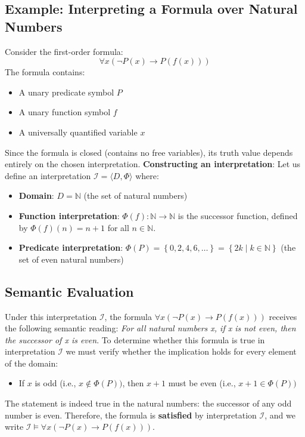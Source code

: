 \documentclass[a4paper]{article}
\theoremstyle{definition}
\begin{document}
\subsection{Example: Interpreting a Formula over Natural Numbers}
Consider the first-order formula:
\[
  \forall x (\lnot P(x) \rightarrow P(f(x)))
\]
The formula contains:
\begin{itemize}
	\item A unary predicate symbol \( P \) 
	\item A unary function symbol \( f \)
	\item A universally quantified variable \( x \)
\end{itemize}
Since the formula is closed (contains no free variables), its truth value depends entirely on the chosen interpretation.
\vspace{1em}
\noindent
\newline
\textbf{Constructing an interpretation}: Let us define an interpretation \( \mathcal{I} = \langle D, \Phi \rangle \) where:
\begin{itemize}
	\item \textbf{Domain}: \( D = \mathbb{N} \) (the set of natural numbers)
	\item \textbf{Function interpretation}: \( \Phi(f) : \mathbb{N} \rightarrow \mathbb{N} \) is the successor function, defined by \( \Phi(f)(n) = n + 1 \) for all \( n \in \mathbb{N} \).
	\item \textbf{Predicate interpretation}: \( \Phi(P) = \left\{0,2,4,6,\ldots \right\} = \left\{ 2k \;|\; k \in \mathbb{N} \right\} \) (the set of even natural numbers)
\end{itemize}
\subsection{Semantic Evaluation}
Under this interpretation \( \mathcal{I} \), the formula \( \forall x (\lnot P(x) \rightarrow P(f(x))) \) receives the following 
semantic reading:
\vspace{1em}
\noindent
\newline
\textit{For all natural numbers x, if x is not even, then the successor of x is even}.
\vspace{1em}
\noindent
\newline
To determine whether this formula is true in interpretation \( \mathcal{I} \) we must verify whether the implication holds for every element of the domain:
\begin{itemize}
	\item If \( x \) is odd (i.e., \( x \notin \Phi(P)) \), then \( x + 1 \) must be even (i.e., \( x + 1 \in \Phi(P)) \)
\end{itemize}
The statement is indeed true in the natural numbers: the successor of any odd number is even.
Therefore, the formula is \textbf{satisfied} by interpretation \( \mathcal{I} \), and we write \( \mathcal{I} \models \forall x(\lnot P(x) \rightarrow P(f(x))) \).
\end{document}
